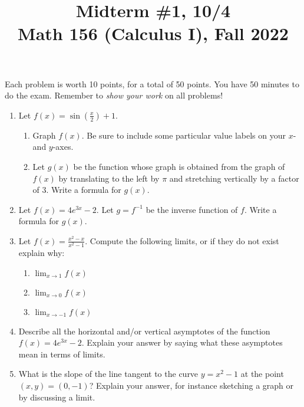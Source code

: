\documentclass[11pt]{article}
\title{Midterm \#1, 10/4 \\ Math 156 (Calculus I), Fall 2022}
\date{}
\begin{document}
\maketitle

\thispagestyle{empty}

\vspace{-1cm}

Each problem is worth 10 points, for a total of 50 points. You have 50 minutes to do the exam. Remember to \emph{show your work} on all problems!

\begin{enumerate}
\item Let $f(x) = \sin(\frac{x}{2})+1$.
\begin{enumerate}
\item Graph $f(x)$. Be sure to include some particular value labels on your $x$- and $y$-axes.
\item Let $g(x)$ be the function whose graph is obtained from the graph of $f(x)$ by translating to the left by $\pi$ and stretching vertically by a factor of $3$. Write a formula for $g(x)$.
\end{enumerate}
\item Let $f(x)=4e^{3x} - 2$. Let $g=f^{-1}$ be the inverse function of $f$. Write a formula for $g(x)$.
\item Let $f(x) = \displaystyle \frac{x^2-x}{x^2-1}$. Compute the following limits, or if they do not exist explain why:
\begin{enumerate}
\item $\displaystyle \lim_{x \to 1} f(x)$
\item $\displaystyle \lim_{x \to 0} f(x)$
\item $\displaystyle \lim_{x \to -1} f(x)$
\end{enumerate}
\item Describe all the horizontal and/or vertical asymptotes of the function $f(x)=4e^{3x} - 2$. Explain your answer by saying what these asymptotes mean in terms of limits.
\item What is the slope of the line tangent to the curve $y=x^2-1$ at the point $(x,y)=(0,-1)$? Explain your answer, for instance sketching a graph or by discussing a limit.
\end{enumerate}
\end{document}
